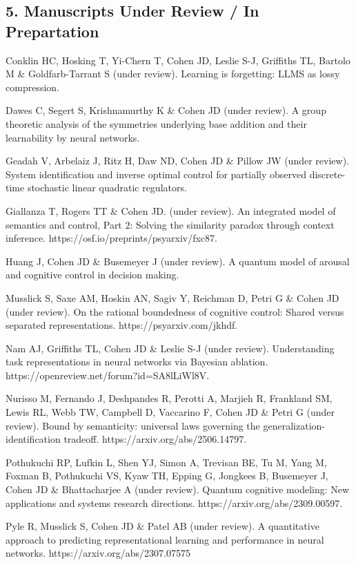 \documentclass[10 pt]{article}
\begin{document}
\subsection*{5. Manuscripts Under Review / In Prepartation} \label{secPUBLICATIONS5}

Conklin HC, Hosking T, Yi-Chern T, Cohen JD, Leslie S-J, Griffiths TL, Bartolo M & Goldfarb-Tarrant S (under review).
Learning is forgetting: LLMS as lossy compression.

Dawes C, Segert S, Krishnamurthy K \& Cohen JD (under review). A group theoretic analysis of the symmetries underlying base addition and their learnability by neural networks.

Geadah V, Arbelaiz J, Ritz H, Daw ND, Cohen JD \& Pillow JW (under review). System identification and inverse optimal control for partially observed discrete-time stochastic linear quadratic regulators.

Giallanza T, Rogers TT \& Cohen JD. (under review). An integrated model of semantics and control, Part 2: Solving the similarity paradox through context inference. https://osf.io/preprints/psyarxiv/fxc87.

Huang J, Cohen JD \& Busemeyer J (under review). A quantum model of arousal and cognitive control in decision making.

Musslick S, Saxe AM, Hoskin AN, Sagiv Y, Reichman D, Petri G \& Cohen JD (under review). On the rational boundedness of cognitive control: Shared versus separated representations. https://psyarxiv.com/jkhdf.

Nam AJ, Griffiths TL, Cohen JD \& Leslie S-J (under review). Understanding task representations in neural networks via Bayesian ablation. https://openreview.net/forum?id=SA8lLiWl8V.

Nurisso M, Fernando J, Deshpandes R, Perotti A, Marjieh R, Frankland SM, Lewis RL, Webb TW, Campbell D, Vaccarino F, Cohen JD \& Petri G (under review). Bound by semanticity: universal laws governing the generalization-identification tradeoff. https://arxiv.org/abs/2506.14797.

Pothukuchi RP, Lufkin L, Shen YJ, Simon A, Trevisan BE, Tu M, Yang M, Foxman B, Pothukuchi VS, Kyaw TH, Epping G, Jongkees B, Busemeyer J, Cohen JD \& Bhattacharjee A (under review). Quantum cognitive modeling: New applications and systems research directions. https://arxiv.org/abs/2309.00597.

Pyle R, Musslick S, Cohen JD \& Patel AB (under review). A quantitative approach to predicting representational learning and performance in neural networks. https://arxiv.org/abs/2307.07575
\end{document}
